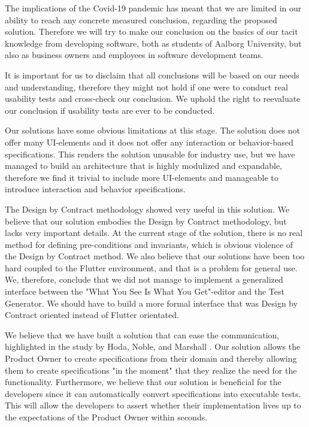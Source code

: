 The implications of the Covid-19 pandemic has meant that we are limited in our ability to reach any concrete measured conclusion, regarding the proposed solution.
Therefore we will try to make our conclusion on the basics of our tacit knowledge from developing software, both as students of Aalborg University, but also as business owners and employees in software development teams.

It is important for us to disclaim that all conclusions will be based on our needs and understanding, therefore they might not hold if one were to conduct real usability tests and cross-check our conclusion.
We uphold the right to reevaluate our conclusion if usability tests are ever to be conducted.

Our solutions have some obvious limitations at this stage.
The solution does not offer many UI-elements and it does not offer any interaction or behavior-based specifications.
This renders the solution unusable for industry use, but we have managed to build an architecture that is highly modulized and expandable, therefore we find it trivial to include more UI-elements and manageable to introduce interaction and behavior specifications.

The Design by Contract methodology showed very useful in this solution.
We believe that our solution embodies the Design by Contract methodology, but lacks very important details.
At the current stage of the solution, there is no real method for defining pre-conditions and invariants, which is obvious violence of the Design by Contract method.
We also believe that our solutions have been too hard coupled to the Flutter environment, and that is a problem for general use. 
We, therefore, conclude that we did not manage to implement a generalized interface between the "What You See Is What You Get"-editor and the Test Generator.
We should have to build a more formal interface that was Design by Contract oriented instead of Flutter orientated.

We believe that we have built a solution that can ease the communication, highlighted in the study by Hoda, Noble, and Marshall \cite{Hoda2011TheIO}. 
Our solution allows the Product Owner to create specifications from their domain and thereby allowing them to create specifications "in the moment" that they realize the need for the functionality.
Furthermore, we believe that our solution is beneficial for the developers since it can automatically convert specifications into executable tests.
This will allow the developers to assert whether their implementation lives up to the expectations of the Product Owner within seconds.